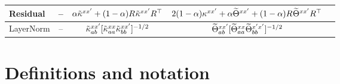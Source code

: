 \documentclass{article}
\begin{document}
\begin{table}[t]
\begin{center}
\begin{sc}
\begin{tabular}{lcccc}
    Residual
    &
    --
    &
    $
        \alpha 
        \tilde{\kappa}^{xx'}
        +
        (1 - \alpha)
        R_{}^{}
        \tilde{\kappa}^{xx'}
        R_{}^{\top}
    $
    &
    $
    2 (1 - \alpha)
    \kappa^{xx'}
    +
    \alpha
    \widetilde{\Theta}^{x x'}
    +
    (1 - \alpha) 
    R_{}^{} 
    \widetilde{\Theta}^{xx'}
    R_{}^{\top}
    $
    \\
    
    \midrule
    
    LayerNorm  &
    --
    &
    $
        \tilde{\kappa}_{ab}^{xx'}
        [
            \tilde{\kappa}_{aa}^{xx}
            \tilde{\kappa}_{bb}^{xx'}
        ]^{-1/2}
    $
    &
    $
        \widetilde{\Theta}_{ab}^{xx'}
        [
            \widetilde{\Theta}_{aa}^{xx}
            \widetilde{\Theta}_{bb}^{x'x'}
        ]^{-1/2}
    $
    
    \\
    \bottomrule
\end{tabular}
\end{sc}
\end{center}
\vskip -0.18in
\end{table}




\section{Definitions and notation}\label{sect:background}
\end{document}
